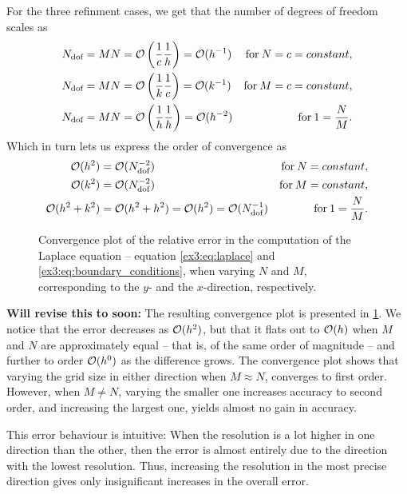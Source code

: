 For the three refinment cases, 
we get that the number of degrees of freedom scales as 
\begin{align*}
    N_{\text{dof}} & = MN = \mathcal{O}\left(\frac{1}{c}\frac{1}{h}\right) = \mathcal{O}(h^{-1}) & \text{for} \: N = c = constant, \\
    N_{\text{dof}} & = MN = \mathcal{O}\left(\frac{1}{k}\frac{1}{c}\right) = \mathcal{O}(k^{-1}) & \text{for} \: M = c = constant, \\
    N_{\text{dof}} & = MN = \mathcal{O}\left(\frac{1}{h}\frac{1}{h}\right) = \mathcal{O}(h^{-2}) & \text{for} \: 1 = \frac{N}{M}.
\end{align*}
Which in turn lets us express the order of convergence as 
\begin{align*}
    \mathcal{O}(h^2) & = \mathcal{O}(N_{\text{dof}}^{-2}) & \text{for} \: N = constant, \\
    \mathcal{O}(k^2) & = \mathcal{O}(N_{\text{dof}}^{-2}) & \text{for} \: M = constant, \\
    \mathcal{O}(h^2 + k^2) & = \mathcal{O}(h^2 + h^2) = \mathcal{O}(h^2) = \mathcal{O}(N_{\text{dof}}^{-1}) & \text{for} \: 1 = \frac{N}{M}.
\end{align*}

\begin{figure}[tbp]
    \centering
    
    \caption{Convergence plot of the relative error in the computation of the Laplace equation -- equation \eqref{ex3:eq:laplace} and \eqref{ex3:eq:boundary_conditions}, when varying $N$ and $M$, corresponding to the $y$- and the $x$-direction, respectively.}
    \label{ex3:fig:convergence_plot}
\end{figure}

\textbf{Will revise this to soon:}
The resulting convergence plot is presented in \ref{ex3:fig:convergence_plot}. 
We notice that the error decreases as $\mathcal{O}(h^2)$, but that it flats out to $\mathcal{O}(h)$ when $M$ and $N$ are approximately equal -- that is, of the same order of magnitude -- and further to order $\mathcal{O}(h^0)$ as the difference grows.
The convergence plot shows that varying the grid size in either direction when $M \approx N$, converges to first order.
However, when $M \neq N$, varying the smaller one increases accuracy to second order, and increasing the largest one, yields almost no gain in accuracy.

This error behaviour is intuitive: When the resolution is a lot higher in one direction than the other, then the error is almost entirely due to the direction with the lowest resolution.
Thus, increasing the resolution in the most precise direction gives only insignificant increases in the overall error.
